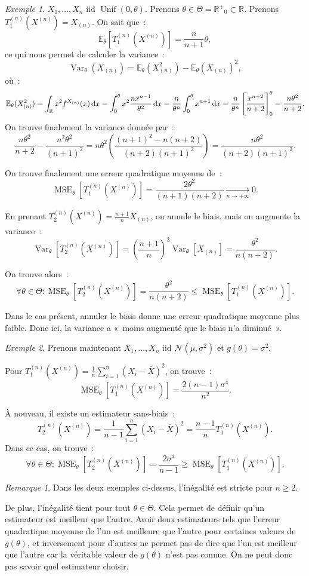 \documentclass{report}
\DeclareMathOperator{\Unif}{Unif}  %
\DeclareMathOperator{\Var}{Var}
\DeclareMathOperator{\MSE}{MSE}
\newcommand{\E}{\mathbb E}
\newcommand{\pinfty}{{+\infty}}
\newcommand{\Nms}{\mathcal N(\mu, \sigma^2)}
\newcommand{\R}{\mathbb R}
\newcommand{\Rp}{{\mathbb R^+}}
\newcommand{\n}{{(n)}}
\newcommand{\Xn}{{X^\n}}
\theoremstyle{definition}
\theoremstyle{remark}
\newtheorem*{rmq}{Remarque}
\newtheorem{ex}{Exemple}[chapter]
\begin{document}
			\begin{ex} $X_1, \ldots, X_n$ iid $\Unif(0, \theta)$. Prenons $\theta \in \Theta = \Rp_0 \subset \R$. Prenons $T_1^{(n)}(\Xn) = X_{(n)}$. On sait que~:
			\[\E_\theta[T_1^{(n)}(\Xn)] = \frac n{n+1}\theta,\]
			ce qui nous permet de calculer la variance~:
			\[\Var_\theta(X_{(n)}) = \E_\theta(X_{(n)}^2) - \E_\theta(X_{(n)})^2,\]
			où~:
			\[\E_\theta(X_{(n)}^2) = \int_\R x^2f^{X_{(n)}}(x)\dif x = \int_0^\theta x^2\frac {nx^{n-1}}{\theta^2}\dif x = \frac n{\theta^n}\int_0^\theta x^{n+1}\dif x
				= \frac n{\theta^n}\left[\frac {x^{n+2}}{n+2}\right]_0^\theta = \frac {n\theta^2}{n+2}.\]
			On trouve finalement la variance donnée par~:
			\[\frac {n\theta^2}{n+2} - \frac {n^2\theta^2}{(n+1)^2} = n\theta^2\left(\frac {(n+1)^2 - n(n+2)}{(n+2)(n+1)^2}\right) = \frac {n\theta^2}{(n+2)(n+1)^2}.\]

			On trouve finalement une erreur quadratique moyenne de~:
			\[\MSE_\theta[T_1^{(n)}(\Xn)] = \frac {2\theta^2}{(n+1)(n+2)} \xrightarrow[n \to \pinfty]{} 0.\]

			En prenant $T_2^{(n)}(\Xn) = \frac {n+1}nX_{(n)}$, on annule le biais, mais on augmente la variance~:
			\[\Var_\theta[T_2^{(n)}(\Xn)] = \left(\frac {n+1}n\right)^2\Var_\theta[X_{(n)}] = \frac {\theta^2}{n(n+2)}.\]

			On trouve alors~:
			\[\forall \theta \in \Theta : \MSE_\theta[T_2^{(n)}(\Xn)] = \frac {\theta^2}{n(n+2)} \leq \MSE_\theta[T_1^{(n)}(\Xn)].\]

			Dans le cas présent, annuler le biais donne une erreur quadratique moyenne plus faible. Donc ici, la variance a «~moins augmenté que le biais n'a diminué~».
			\end{ex}

			\begin{ex} Prenons maintenant $X_1, \ldots, X_n$ iid $\Nms$ et $g(\theta) = \sigma^2$.

			Pour $T_1^{(n)}(\Xn) = \frac 1n\sum_{i=1}^n(X_i - \overline X)^2$, on trouve~:
			\[\MSE_\theta[T_1^{(n)}(\Xn)] = \frac {2(n-1)\sigma^4}{n^2}.\]

			À nouveau, il existe un estimateur sans-biais~:
			\[T_2^{(n)}(\Xn) = \frac 1{n-1}\sum_{i=1}^n(X_i - \overline X)^2 = \frac {n-1}nT_1^{(n)}(\Xn).\]
			Dans ce cas, on trouve~:
			\[\forall \theta \in \Theta : \MSE_\theta[T_2^{(n)}(\Xn)] = \frac {2\sigma^4}{n-1} \geq \MSE_\theta[T_1^{(n)}(\Xn)].\]
			\end{ex}

			\begin{rmq} Dans les deux exemples ci-dessus, l'inégalité est stricte pour $n \geq 2$.

			De plus, l'inégalité tient pour tout $\theta \in \Theta$. Cela permet de définir qu'un estimateur est meilleur que l'autre. Avoir deux estimateurs tels
			que l'erreur quadratique moyenne de l'un est meilleure que l'autre pour certaines valeurs de $g(\theta)$, et inversement pour d'autres ne permet pas de dire
			que l'un est meilleur que l'autre car la véritable valeur de $g(\theta)$ n'est pas connue. On ne peut donc pas savoir quel estimateur choisir.
			\end{rmq}
\end{document}

